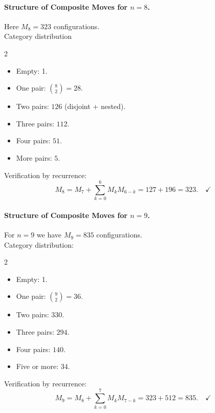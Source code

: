 \documentclass[runningheads]{llncs}
\begin{document}
\paragraph{Structure of Composite Moves for $n=8$.} Here $M_8 = 323$ configurations.
\\
Category distribution
\begin{multicols}{2}
\begin{itemize}
  \item Empty: 1.
  \item One pair: $\binom{8}{2} = 28$.
  \item Two pairs: $ 126$ (disjoint + nested).
  \item Three pairs: $ 112$.
  \item Four pairs: $ 51$.
  \item More pairs: $ 5$.
\end{itemize}
\end{multicols}
Verification by recurrence:
\begin{equation}
M_8 = M_7 + \sum_{k=0}^{6} M_k M_{6-k} = 127 + 196 = 323. \quad \checkmark
\end{equation}

\paragraph{Structure of Composite Moves for $n=9$.}
For $n=9$ we have $M_9 = 835$ configurations.
\\
Category distribution:
\begin{multicols}{2}
\begin{itemize}
  \item Empty: 1.
  \item One pair: $\binom{9}{2} = 36$.
  \item Two pairs: $ 330$.
  \item Three pairs: $ 294$.
  \item Four pairs: $ 140$.
  \item Five or more: $ 34$.
\end{itemize}
\end{multicols}
Verification by recurrence:
\begin{equation}
M_9 = M_8 + \sum_{k=0}^{7} M_k M_{7-k} = 323 + 512 = 835. \quad \checkmark 
\end{equation}
\end{document}
